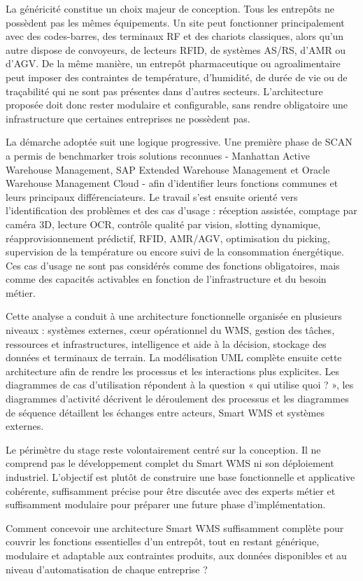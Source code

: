 La généricité constitue un choix majeur de conception. Tous les entrepôts ne possèdent pas les mêmes équipements. Un site peut fonctionner principalement avec des codes-barres, des terminaux RF et des chariots classiques, alors qu’un autre dispose de convoyeurs, de lecteurs RFID, de systèmes AS/RS, d’AMR ou d’AGV. De la même manière, un entrepôt pharmaceutique ou agroalimentaire peut imposer des contraintes de température, d’humidité, de durée de vie ou de traçabilité qui ne sont pas présentes dans d’autres secteurs. L’architecture proposée doit donc rester modulaire et configurable, sans rendre obligatoire une infrastructure que certaines entreprises ne possèdent pas.


La démarche adoptée suit une logique progressive. Une première phase de SCAN a permis de benchmarker trois solutions reconnues - Manhattan Active Warehouse Management, SAP Extended Warehouse Management et Oracle Warehouse Management Cloud - afin d’identifier leurs fonctions communes et leurs principaux différenciateurs. Le travail s’est ensuite orienté vers l’identification des problèmes et des cas d’usage : réception assistée, comptage par caméra 3D, lecture OCR, contrôle qualité par vision, slotting dynamique, réapprovisionnement prédictif, RFID, AMR/AGV, optimisation du picking, supervision de la température ou encore suivi de la consommation énergétique. Ces cas d’usage ne sont pas considérés comme des fonctions obligatoires, mais comme des capacités activables en fonction de l’infrastructure et du besoin métier.


Cette analyse a conduit à une architecture fonctionnelle organisée en plusieurs niveaux : systèmes externes, cœur opérationnel du WMS, gestion des tâches, ressources et infrastructures, intelligence et aide à la décision, stockage des données et terminaux de terrain. La modélisation UML complète ensuite cette architecture afin de rendre les processus et les interactions plus explicites. Les diagrammes de cas d’utilisation répondent à la question « qui utilise quoi ? », les diagrammes d’activité décrivent le déroulement des processus et les diagrammes de séquence détaillent les échanges entre acteurs, Smart WMS et systèmes externes.


Le périmètre du stage reste volontairement centré sur la conception. Il ne comprend pas le développement complet du Smart WMS ni son déploiement industriel. L’objectif est plutôt de construire une base fonctionnelle et applicative cohérente, suffisamment précise pour être discutée avec des experts métier et suffisamment modulaire pour préparer une future phase d’implémentation.



\begin{problematique}Comment concevoir une architecture Smart WMS suffisamment complète pour couvrir les fonctions essentielles d’un entrepôt, tout en restant générique, modulaire et adaptable aux contraintes produits, aux données disponibles et au niveau d’automatisation de chaque entreprise ?\end{problematique}
